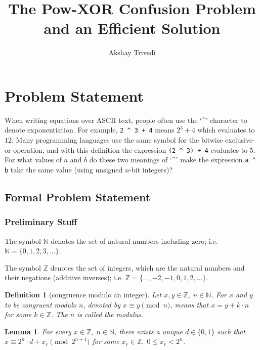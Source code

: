 \documentclass[1gpt]{article}
\title{The Pow-XOR Confusion Problem and an Efficient Solution}
\author{Akshay Trivedi}
\date{\vspace{-3em}}
\theoremstyle{break}
\newtheorem{lemma}[theorem]{Lemma}
\newtheorem{definition}[theorem]{Definition}
\begin{document}
\maketitle

\section{Problem Statement}

When writing equations over ASCII text, people often use the `\textasciicircum'
character to denote exponentiation. For example, \texttt{2 {\textasciicircum} 3
+ 4} means $2^3+4$ which evaluates to $12$. Many programming languages use the
same symbol for the bitwise exclusive-or operation, and with this definition
the expression \texttt{(2 {\textasciicircum} 3) + 4} evaluates to 5. For what
values of $a$ and $b$ do these two meanings of `\textasciicircum' make the
expression \texttt{a {\textasciicircum} b} take the same value (using unsigned
$n$-bit integers)?

\subsection{Formal Problem Statement}

\subsubsection{Preliminary Stuff}

The symbol $\mathbb{N}$ denotes the set of natural numbers including zero; i.e.
$\mathbb{N} = \{0, 1, 2, 3, \ldots\}$.

The symbol $\mathbb{Z}$ denotes the set of integers, which are the natural
numbers and their negations (additive inverses); i.e. $\mathbb{Z} = \{\ldots,
-2, -1, 0, 1, 2, \ldots\}$.

\begin{definition}[congruence modulo an integer]
    \label{def:mod}
    Let $x, y \in \mathbb{Z},\; n \in \mathbb{N}$. For $x$ and $y$ to be
    congruent modulo $n$, denoted by $x \equiv y \pmod{n}$, means that $x = y +
    k \cdot n$ for some $k \in \mathbb{Z}$. The $n$ is called the modulus.
\end{definition}

\begin{lemma}
    \label{lem:bit-of}
    For every $x \in \mathbb{Z},\; n \in \mathbb{N}$, there exists a unique $d
    \in \{ 0, 1 \}$ such that $x \equiv 2^n \cdot d + x_r \pmod{2^{n+1}}$ for
    some $x_r \in \mathbb{Z},\; 0 \leq x_r < 2^n$.
\end{lemma}
\end{document}
